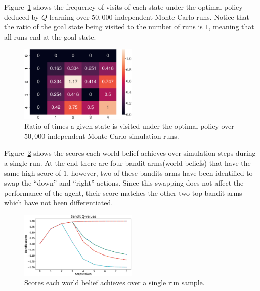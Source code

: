 Figure~\ref{fig:visit_count} shows the frequency of visits of each state under
the optimal policy deduced by $Q$-learning over $50,000$ independent Monte Carlo
runs. Notice that the ratio of the goal state being visited to the number of
runs is $1$, meaning that all runs end at the goal state.
%
\begin{figure}[bth]
    \centering
    \includegraphics[width=0.5\textwidth]{./figures/visit_count_ratio.eps}
    \caption{Ratio of times a given state is visited under the optimal policy over $50,000$ independent Monte Carlo simulation runs.}
    \label{fig:visit_count}
\end{figure}

Figure~\ref{fig:bandit_scores} shows the scores each world belief achieves over
simulation steps during a single run. At the end there are four bandit
arms(world beliefs) that have the same high score of $1$, however, two of these
bandits arms have been identified to swap the ``down'' and ``right'' actions.
Since this swapping does not affect the performance of the agent, their score
matches the other two top bandit arms which have not been differentiated.
%
\begin{figure}[bth]
    \centering
    \includegraphics[width=0.5\textwidth]{./figures/bandit_scores.eps}
    \caption{Scores each world belief achieves over a single run sample.}
    \label{fig:bandit_scores}
\end{figure}